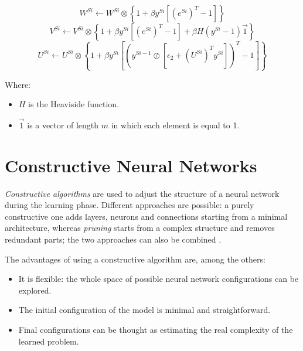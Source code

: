 \documentclass[11pt,a4paper]{report}
\begin{document}
				\begin{equation}
					W^{Si} \leftarrow W^{Si} \otimes \left\{ 1 + \beta y^{Si} \left[ \left( e^{Si} \right)^T - 1 \right] \right\}
				\end{equation}
				\begin{equation}
					V^{Si} \leftarrow V^{Si} \otimes \left\{ 1 + \beta y^{Si} \left[ \left( e^{Si} \right)^T - 1 \right] + \beta H(y^{Si} - 1) \overrightarrow{1} \right\}
				\end{equation}
				\begin{equation}
					U^{Si} \leftarrow U^{Si} \otimes \left\{ 1 + \beta y^{Si} \left[ \left( y^{Si-1} \oslash \left[ \epsilon_2 + (U^{Si})^T y^{Si} \right] \right)^T - 1 \right] \right\}
				\end{equation}
				
				Where:
				\begin{itemize}
					\item $H$ is the Heaviside function.
					\item $\overrightarrow{1}$ is a vector of length $m$ in which each element is equal to 1.
					
				\end{itemize}
				
		\section{Constructive Neural Networks}
		\label{sec:constructive}
			\emph{Constructive algorithms} are used to adjust the structure of a neural network during the learning phase. Different approaches are possible: a purely constructive one adds layers, neurons and connections starting from a minimal architecture, whereas \emph{pruning} starts from a complex structure and removes redundant parts; the two approaches can also be combined \cite{parekh2000constructive}.
					
			The advantages of using a constructive algorithm are, among the others:
			\begin{itemize}
				\item It is flexible: the whole space of possible neural network configurations can be explored.
				\item The initial configuration of the model is minimal and straightforward.
				\item Final configurations can be thought as estimating the real complexity of the learned problem.
			\end{itemize}
					
\end{document}
